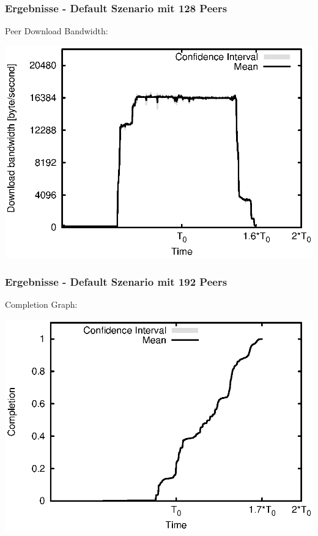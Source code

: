 \begin{frame}
  \frametitle{Ergebnisse - Default Szenario mit 128 Peers}
  Peer Download Bandwidth:
  
  \begin{center}
    \includegraphics[width=1\textwidth]{fig/plots/scenario_4_peer_count_128/plots/GeneratedMeanCurrentDownloadBandwidth.csv.eps}
  \end{center}
\end{frame}


\begin{frame}
  \frametitle{Ergebnisse - Default Szenario mit 192 Peers}
  Completion Graph:
  
  \begin{center}
    \includegraphics[width=1\textwidth]{fig/plots/scenario_11_peer_count_192_v2/plots/GeneratedMeanChunkCompletion.csv.eps}
  \end{center}
\end{frame}


